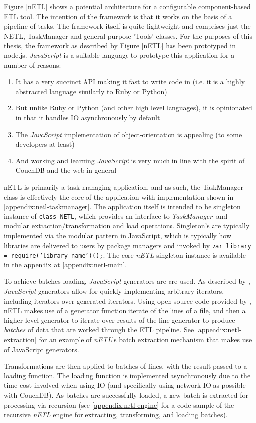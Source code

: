Figure \ref{nETL} shows a potential architecture for a configurable component-based ETL tool. The intention of the framework is that it works on the basis of a pipeline of tasks. The framework itself is quite lightweight and comprises just the NETL, TaskManager and general purpose 'Tools' classes. For the purposes of this thesis, the framework as described by Figure \ref{nETL} has been prototyped in node.js. \textit{JavaScript} is a suitable language to prototype this application for a number of reasons:

\begin{enumerate}
    \item It has a very succinct API making it fast to write code in (i.e. it is a highly abstracted language similarly to Ruby or Python)
    \item But unlike Ruby or Python (and other high level languages), it is opinionated in that it handles IO asynchronously by default
    \item The \textit{JavaScript} implementation of object-orientation is appealing (to some developers at least)
    \item And working and learning \textit{JavaScript} is very much in line with the spirit of CouchDB and the web in general
\end{enumerate}

nETL is primarily a task-managing application, and as such, the TaskManager class is effectively the core of the application with implementation shown in \ref{appendix:netl-taskmanager}. The application itself is intended to be singleton instance of \texttt{class NETL{}}, which provides an interface to \textit{TaskManager}, and modular extraction/transformation and load operations. Singleton's are typically implemented via the modular pattern in JavaScript, which is typically how libraries are delivered to users by package managers and invoked by \texttt{var library = require('library-name')();}. The core \textit{nETL} singleton instance is available in the appendix at \ref{appendix:netl-main}.

To achieve batches loading, \textit{JavaScript} generators are are used. As described by \cite{mozillaGenerators}, \textit{JavaScript} generators allow for quickly implementing arbitrary iterators, including iterators over generated iterators. Using open source code provided by \cite{bower16}, nETL makes use of a generator function iterate of the lines of a file, and then a higher level generator to iterate over results of the line generator to produce \textit{batches} of data that are worked through the ETL pipeline. See \ref{appendix:netl-extraction} for an example of \textit{nETL}'s batch extraction mechanism that makes use of JavaScript generators.

Transformations are then applied to batches of lines, with the result passed to a loading function. The loading function is implemented asynchronously due to the time-cost involved when using IO (and specifically using network IO as possible with CouchDB). As batches are successfully loaded, a new batch is extracted for processing via recursion (see \ref{appendix:netl-engine} for a code sample of the recursive \textit{nETL} engine for extracting, transforming, and loading batches).